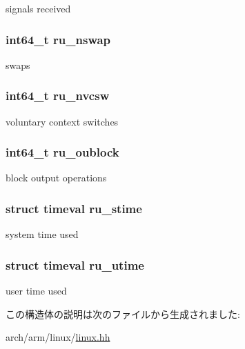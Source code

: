 signals received \hypertarget{structArmLinux64_1_1rusage_afc5c49c140619cf89254b7d8c5d4a7e4}{
\subsubsection[{ru\_\-nswap}]{\setlength{\rightskip}{0pt plus 5cm}int64\_\-t {\bf ru\_\-nswap}}}
\label{structArmLinux64_1_1rusage_afc5c49c140619cf89254b7d8c5d4a7e4}


swaps \hypertarget{structArmLinux64_1_1rusage_a488b8289bbd360fe61edb0bc26ccdb4d}{
\subsubsection[{ru\_\-nvcsw}]{\setlength{\rightskip}{0pt plus 5cm}int64\_\-t {\bf ru\_\-nvcsw}}}
\label{structArmLinux64_1_1rusage_a488b8289bbd360fe61edb0bc26ccdb4d}


voluntary context switches \hypertarget{structArmLinux64_1_1rusage_a15fb59113ce07eadb77fd013deda9ed6}{
\subsubsection[{ru\_\-oublock}]{\setlength{\rightskip}{0pt plus 5cm}int64\_\-t {\bf ru\_\-oublock}}}
\label{structArmLinux64_1_1rusage_a15fb59113ce07eadb77fd013deda9ed6}


block output operations \hypertarget{structArmLinux64_1_1rusage_a15f836efd7b69c0a0eb19f5d9505e3e9}{
\subsubsection[{ru\_\-stime}]{\setlength{\rightskip}{0pt plus 5cm}struct {\bf timeval} {\bf ru\_\-stime}}}
\label{structArmLinux64_1_1rusage_a15f836efd7b69c0a0eb19f5d9505e3e9}


system time used \hypertarget{structArmLinux64_1_1rusage_a40e27c5d4340b0c6532787d6740b22ab}{
\subsubsection[{ru\_\-utime}]{\setlength{\rightskip}{0pt plus 5cm}struct {\bf timeval} {\bf ru\_\-utime}}}
\label{structArmLinux64_1_1rusage_a40e27c5d4340b0c6532787d6740b22ab}


user time used 

この構造体の説明は次のファイルから生成されました:\begin{DoxyCompactItemize}
\item 
arch/arm/linux/\hyperlink{arch_2arm_2linux_2linux_8hh}{linux.hh}\end{DoxyCompactItemize}
